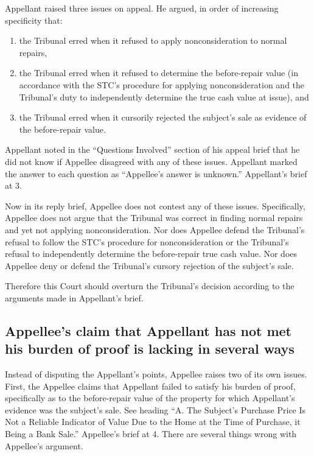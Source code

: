 \documentclass[12pt,\documentclassflag]{michiganCourtOfAppealsBrief}
\begin{document}
Appellant raised three issues on appeal. He argued, in order of increasing specificity that:

\begin{enumerate}
\item the Tribunal erred when it refused to apply nonconsideration to normal repairs,
\item the Tribunal erred when it refused to determine the before-repair value (in accordance with the STC's procedure for applying nonconsideration and the Tribunal's duty to independently determine the true cash value at issue), and
\item the Tribunal erred when it cursorily rejected the subject's sale as evidence of the before-repair value.
\end{enumerate}


Appellant noted in the ``Questions Involved'' section of his appeal brief that he did not know if Appellee disagreed with any of these issues. Appellant marked the answer to each question as ``Appellee's answer is unknown.'' Appellant's brief at 3.

Now in its reply brief, Appellee does not contest any of these issues. Specifically, Appellee does not argue that the Tribunal was correct in finding normal repairs and yet not applying nonconsideration. Nor does Appellee defend the Tribunal's refusal to follow the STC's procedure for nonconsideration or the Tribunal's refusal to independently determine the before-repair true cash value. Nor does Appellee deny or defend the Tribunal's cursory rejection of the subject's sale.

Therefore this Court should overturn the Tribunal's decision according to the arguments made in Appellant's brief.

\subsection{Appellee's claim that Appellant has not met his burden of proof is lacking in several ways}
 
Instead of disputing the Appellant's points, Appellee raises two of its own issues. First, the Appellee claims that Appellant failed to satisfy his burden of proof, specifically as to the before-repair value of the property for which Appellant's evidence was the subject's sale. See heading ``A.  The Subject's Purchase Price Is Not a Reliable Indicator of Value Due to the Home at the Time of Purchase, it Being a Bank Sale.'' Appellee's brief at 4. There are several things wrong with Appellee's argument.
\end{document}

